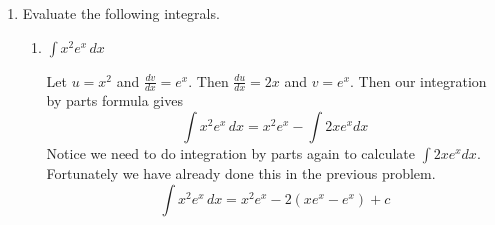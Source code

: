 \documentclass[main]{subfiles}
\begin{document}
\begin{enumerate}
\begin{enumerate}
        \begin{solution}
            Student responses will vary, but this conversation is steering them towards the intuition that we want to choose $u$ so that it becomes simpler when we differentiate.
        \end{solution}

        \item 
        \begin{problem}
            Looking back to the formula for integration by parts and our work so far, what happens to our choice of $u$? How could this guide our initial choice for $u$?
        \end{problem}

        \begin{solution}
            We want to choose a part of the integrand as $u$ so that it becomes simpler through differentiating.
        \end{solution}

           \item 
        \begin{problem}
            What about our choices of $\dfrac{dv}{dx}$ (or $g'(x)dx$ if you used Lagrange notation)? What did we notice happens to our choices in the formula? How could this guide our choice?
        \end{problem}

        \begin{solution}
         We want to choose $\dfrac{dv}{dx}$ so that it does not become more complicated when we integrate.
        \end{solution}
        
    \end{enumerate}

\item 
Evaluate the following integrals.

\begin{enumerate}
    
\item
  \begin{problem} [\vfill]
    $\displaystyle \int  x^2e^x\,dx$
  \end{problem}
  
  \begin{solution} 
Let $u = x^2$ and  $\frac{dv}{dx} = e^x$. Then $\frac{du}{dx} = 2x$ and $v = e^x$. Then our integration by parts formula gives 
     $$\displaystyle \int  x^2e^x\,dx = x^2 e^x - \int 2x e^x dx$$
Notice we need to do integration by parts again to calculate  $\int 2x e^x dx$. Fortunately we have already done this in the previous problem. 
     $$\displaystyle \int  x^2e^x\,dx = x^2 e^x -2(xe^x - e^x)+c$$


\end{solution}
\end{enumerate}
\end{enumerate}
\end{document}
